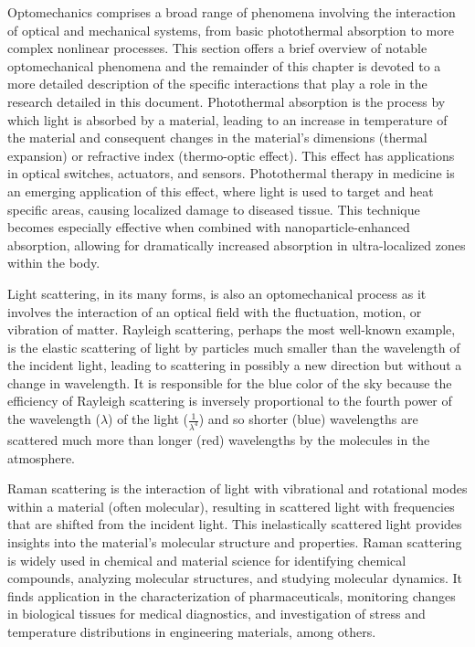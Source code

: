Optomechanics comprises a broad range of phenomena involving the interaction of optical and mechanical systems, from basic photothermal absorption to more complex nonlinear processes. This section offers a brief overview of notable optomechanical phenomena and the remainder of this chapter is devoted to a more detailed description of the specific interactions that play a role in the research detailed in this document. Photothermal absorption is the process by which light is absorbed by a material, leading to an increase in temperature of the material and consequent changes in the material's dimensions (thermal expansion) or refractive index (thermo-optic effect). This effect has applications in optical switches\cite{}, actuators\cite{}, and sensors\cite{}. Photothermal therapy in medicine is an emerging application of this effect, where light is used to target and heat specific areas, causing localized damage to diseased tissue\cite{}. This technique becomes especially effective when combined with nanoparticle-enhanced absorption, allowing for dramatically increased absorption in ultra-localized zones within the body.

Light scattering, in its many forms, is also an optomechanical process as it involves the interaction of an optical field with the fluctuation, motion, or vibration of matter. Rayleigh scattering, perhaps the most well-known example, is the elastic scattering of light by particles much smaller than the wavelength of the incident light, leading to scattering in possibly a new direction but without a change in wavelength. It is responsible for the blue color of the sky because the efficiency of Rayleigh scattering is inversely proportional to the fourth power of the wavelength ($\lambda$) of the light ($\frac{1}{\lambda^{4}}$) and so shorter (blue) wavelengths are scattered much more than longer (red) wavelengths by the molecules in the atmosphere.\cite{rayleigh1871light}

Raman scattering is the interaction of light with vibrational and rotational modes within a material (often molecular), resulting in scattered light with frequencies that are shifted from the incident light. This inelastically scattered light provides insights into the material's molecular structure and properties. Raman scattering is widely used in chemical and material science for identifying chemical compounds, analyzing molecular structures, and studying molecular dynamics. It finds application in the characterization of pharmaceuticals\cite{}, monitoring changes in biological tissues for medical diagnostics\cite{}, and investigation of stress and temperature distributions in engineering materials\cite{}, among others\cite{}.

